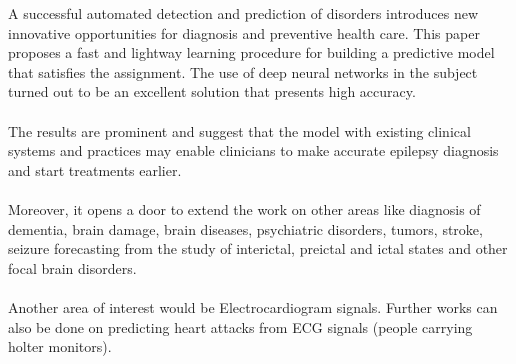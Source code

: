 \documentclass{llncs}       %
\begin{document}
 A successful automated detection and prediction of disorders introduces new innovative opportunities for diagnosis and preventive health care. This paper proposes a fast and lightway learning procedure for building a predictive model that satisfies the assignment. The use of deep neural networks in the subject turned out to be an excellent solution that presents high accuracy.  
\paragraph{}
The results are prominent and suggest that the model with existing clinical systems and practices may enable clinicians to make accurate epilepsy diagnosis and start  treatments earlier.
\paragraph{}
Moreover, it opens a door to extend the work on other areas like diagnosis of dementia, brain damage, brain diseases, psychiatric disorders, tumors, stroke, seizure forecasting from the study of interictal, preictal and ictal states and other focal brain disorders. 
\paragraph{}
Another area of interest would be Electrocardiogram signals. Further works can also be done on predicting heart attacks from ECG signals (people carrying holter monitors). 
\end{document}
